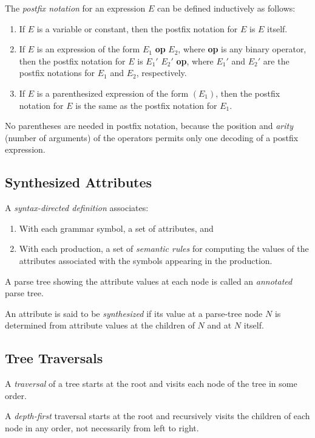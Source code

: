 \documentclass[a4paper,twoside]{book}
\begin{document}
The \textit{postfix notation} for an expression $E$ can be defined inductively as follows:
\begin{enumerate}
    \item If $E$ is a variable or constant, then the postfix notation for $E$ is $E$ itself.
    \item If $E$ is an expression of the form $E_1$ \textbf{op} $E_2$, where \textbf{op} is any binary operator, then the postfix notation for $E$ is $E_1'$ $E_2'$ \textbf{op}, where $E_1'$ and $E_2'$ are the postfix notations for $E_1$ and $E_2$, respectively.
    \item If $E$ is a parenthesized expression of the form $(E_1)$, then the postfix notation for $E$ is the same as the postfix notation for $E_1$.
\end{enumerate}

No parentheses are needed in postfix notation, because the position and \textit{arity} (number of arguments) of the operators permits only one decoding of a postfix expression.

\subsection{Synthesized Attributes}

A \textit{syntax-directed definition} associates:
\begin{enumerate}
    \item With each grammar symbol, a set of attributes, and
    \item With each production, a set of \textit{semantic rules} for computing the values of the attributes associated with the symbols appearing in the production.
\end{enumerate}

A parse tree showing the attribute values at each node is called an \textit{annotated} parse tree.

An attribute is said to be \textit{synthesized} if its value at a parse-tree node $N$ is determined from attribute values at the children of $N$ and at $N$ itself.

\subsection{Tree Traversals}

A \textit{traversal} of a tree starts at the root and visits each node of the tree in some order.

A \textit{depth-first} traversal starts at the root and recursively visits the children of each node in any order, not necessarily from left to right.
\end{document}

